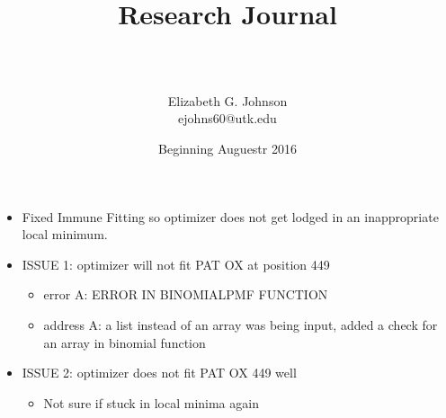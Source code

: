 \documentclass[letterpaper,index=totoc,hyperref,openany]{labbook} %
\title{
\begin{center}
\HRule \\[0.4cm]
{\Huge \bfseries Research Journal \\[0.4cm] %
\HRule \\[1.5cm]}
\end{center}
}
\author{\LARGE Elizabeth G. Johnson \\ \Large ejohns60@utk.edu \\[2cm]} %
\date{Beginning Auguestr 2016} %
\begin{document}
\frontmatter

\maketitle

\tableofcontents

\mainmatter %












\begin{itemize}
\item Fixed Immune Fitting so optimizer does not get lodged in an inappropriate local minimum.
\item ISSUE 1: optimizer will not fit PAT OX at position 449
    \begin{itemize}
    \item{error A: ERROR IN BINOMIALPMF FUNCTION}
    \item{address A: a list instead of an array was being input, added a check for an array in binomial function}
    \end{itemize}
\item ISSUE 2: optimizer does not fit PAT OX 449 well
\begin{itemize}
\item{Not sure if stuck in local minima again}
\end{itemize}


\end{itemize}
\end{document}
